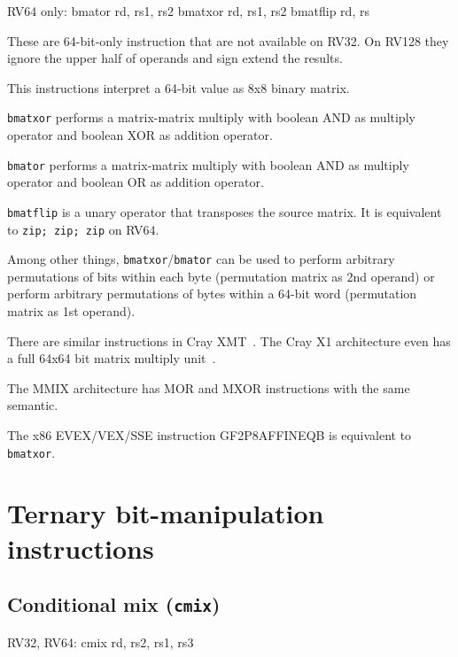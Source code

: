 \begin{rvb}
  RV64 only:
    bmator rd, rs1, rs2
    bmatxor rd, rs1, rs2
    bmatflip rd, rs
\end{rvb}

These are 64-bit-only instruction that are not available on RV32. On RV128 they
ignore the upper half of operands and sign extend the results.

This instructions interpret a 64-bit value as 8x8 binary matrix.

\texttt{bmatxor} performs a matrix-matrix multiply with boolean AND as multiply
operator and boolean XOR as addition operator.

\texttt{bmator} performs a matrix-matrix multiply with boolean AND as multiply
operator and boolean OR as addition operator.

\texttt{bmatflip} is a unary operator that transposes the source matrix. It is
equivalent to \texttt{zip; zip; zip} on RV64.

Among other things, \texttt{bmatxor}/\texttt{bmator} can be used to perform
arbitrary permutations of bits within each byte (permutation matrix as 2nd
operand) or perform arbitrary permutations of bytes within a 64-bit word
(permutation matrix as 1st operand).

There are similar instructions in Cray XMT~\cite{CrayXMT}. The Cray X1
architecture even has a full 64x64 bit matrix multiply unit~\cite{CrayX1}.

The MMIX architecture has MOR and MXOR instructions with the same semantic.~\cite[p.~182f]{Knuth4A}

The x86 EVEX/VEX/SSE instruction GF2P8AFFINEQB is equivalent to {\tt bmatxor}.




\section{Ternary bit-manipulation instructions}


\subsection{Conditional mix ({\tt cmix})}

\begin{rvb}
  RV32, RV64:
    cmix rd, rs2, rs1, rs3
\end{rvb}

